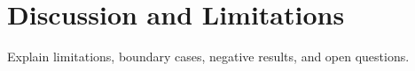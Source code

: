 \section{Discussion and Limitations}
\label{sec:discussion}

Explain limitations, boundary cases, negative results, and open questions.


